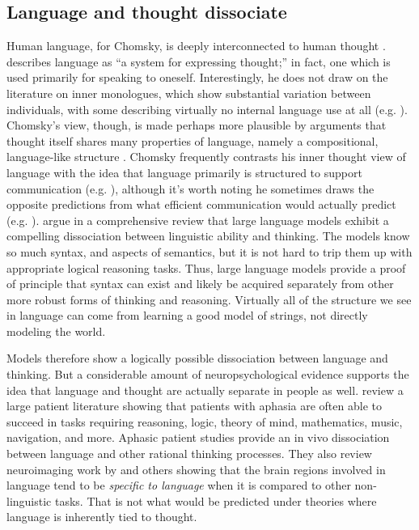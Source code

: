 \documentclass[output=paper,colorlinks,citecolor=brown]{langscibook}
\begin{document}
\subsection{Language and thought dissociate}

Human language, for Chomsky, is deeply interconnected to human thought \citep{everaert2015structures}. \citet{chomsky2002nature} describes language as ``a system for expressing thought;'' in fact, one which is used primarily for speaking to oneself. Interestingly, he does not draw on the literature on inner monologues, which show substantial variation between individuals, with some describing virtually no internal language use at all (e.g. \citealt{reed1916existence,heavey2008phenomena,roebuck2020internal}). Chomsky's view, though, is made perhaps more plausible by arguments that thought itself shares many properties of language, namely a compositional, language-like structure \citep{fodor1975language,fodor1988connectionism,goodman2014concepts,piantadosi2016four,quilty2022best}. Chomsky frequently contrasts his inner thought view of language with the idea that language primarily is structured to support communication (e.g. \citealt{hockett1959animal,bates1982functionalist,gibson2019efficiency}), although it's worth noting he sometimes draws the opposite predictions from what efficient communication would actually predict (e.g. \citealt{piantadosi2012communicative}). \citet{mahowald2023dissociating} argue in a comprehensive review that large language models exhibit a compelling dissociation between linguistic ability and thinking. The models know so much syntax, and aspects of semantics, but it is not hard to trip them up with appropriate logical reasoning tasks. Thus, large language models provide a proof of principle that syntax can exist and likely be acquired separately from other more robust forms of thinking and reasoning. Virtually all of the structure we see in language can come from learning a good model of strings, not directly modeling the world. 

Models therefore show a logically possible dissociation between language and thinking. But a considerable amount of neuropsychological evidence supports the idea that language and thought are actually separate in people as well. \citet{fedorenko2016language} review a large patient literature showing that patients with aphasia are often able to succeed in tasks requiring reasoning, logic, theory of mind, mathematics, music, navigation, and more. Aphasic patient studies provide an in vivo dissociation between language and other rational thinking processes. They also review neuroimaging work by \citet{fedorenko2011functional} and others showing that the brain regions involved in language tend to be \textit{specific to language} when it is compared to other non-linguistic tasks. That is not what would be predicted under theories where language is inherently tied to thought. 
\end{document}
